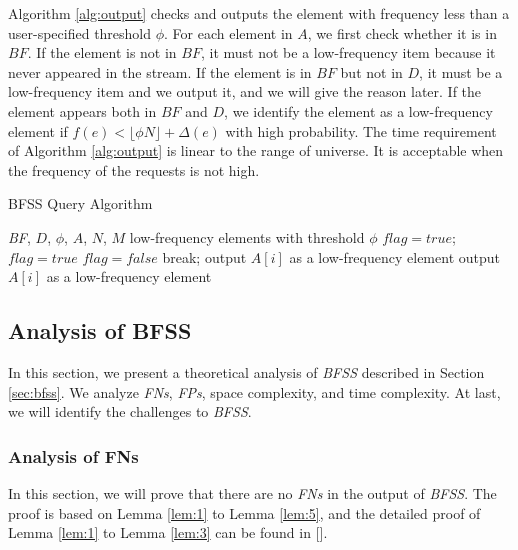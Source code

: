 \documentclass[conference]{IEEEtran}
\begin{document}
Algorithm \ref{alg:output} checks and outputs the element with frequency less than a user-specified threshold $\phi$. For each element in $A$, we first check whether it is in $BF$. If the element is not in $BF$, it must not be a low-frequency item because it never appeared in the stream. If the element is in $BF$ but not in $D$, it must be a low-frequency item and we output it, and we will give the reason later. If the element appears both in $BF$ and $D$, we identify the element as a low-frequency element if $f(e)<\lfloor \phi N\rfloor+\Delta(e)$ with high probability. The time requirement of Algorithm \ref{alg:output} is linear to the range of universe. It is acceptable when the frequency of the requests is not high. 

\begin{algorithm}[h]
	\caption{BFSS Query Algorithm}
	\label{alg:output}
	\begin{algorithmic}[1]
		\REQUIRE \emph{BF}, $D$, $\phi$, $A$, $N$, $M$
		\ENSURE low-frequency elements with threshold $\phi$
		\STATE $flag=true$; 
		\STATE $flag=true$
		\STATE $flag=false$
		\STATE break;
		\ENDIF
		\ENDFOR
		\STATE output $A[i]$ as a low-frequency element
		\ENDIF
		\ELSE
		\STATE output $A[i]$ as a low-frequency element
		\ENDIF
		\ENDIF
		\ENDFOR
	\end{algorithmic}
\end{algorithm}
\subsection{Analysis of BFSS}
In this section, we present a theoretical analysis of \emph{BFSS} described in Section \ref{sec:bfss}. We analyze \emph{FNs}, \emph{FPs}, space complexity, and time complexity. At last, we will identify the challenges to \emph{BFSS}. \par

\subsubsection{\textbf{Analysis of FNs}}
In this section, we will prove that there are no \emph{FNs} in the output of \emph{BFSS}. The proof is based on Lemma \ref{lem:1} to Lemma \ref{lem:5}, and the detailed proof of Lemma \ref{lem:1} to Lemma \ref{lem:3} can be found in [].\par
\end{document}
